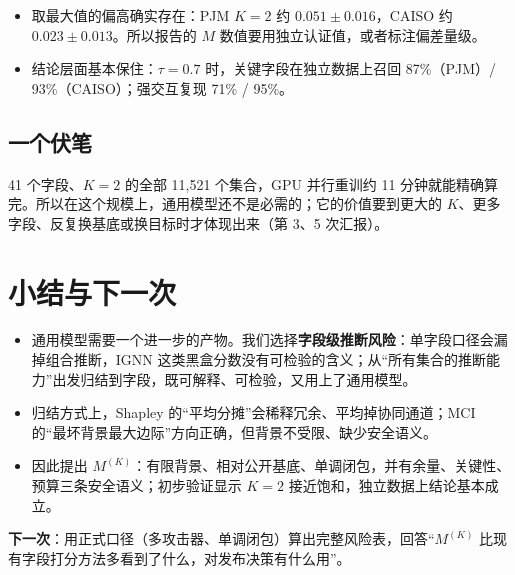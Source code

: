 \documentclass[zihao=-4,a4paper]{ctexart}
\newcommand{\M}{M^{(K)}}
\begin{document}
\begin{itemize}[leftmargin=*]
  \item 取最大值的偏高确实存在：PJM $K=2$ 约 $0.051\pm0.016$，CAISO 约 $0.023\pm0.013$。所以报告的 $M$ 数值要用独立认证值，或者标注偏差量级。
  \item 结论层面基本保住：$\tau=0.7$ 时，关键字段在独立数据上召回 87\%（PJM）/ 93\%（CAISO）；强交互复现 71\% / 95\%。
\end{itemize}

\subsection{一个伏笔}

41 个字段、$K=2$ 的全部 11,521 个集合，GPU 并行重训约 11 分钟就能精确算完。所以在这个规模上，通用模型还不是必需的；它的价值要到更大的 $K$、更多字段、反复换基底或换目标时才体现出来（第 3、5 次汇报）。

\section{小结与下一次}

\begin{keybox}[小结]
\begin{itemize}[leftmargin=*]
  \item 通用模型需要一个进一步的产物。我们选择\textbf{字段级推断风险}：单字段口径会漏掉组合推断，IGNN 这类黑盒分数没有可检验的含义；从“所有集合的推断能力”出发归结到字段，既可解释、可检验，又用上了通用模型。
  \item 归结方式上，Shapley 的“平均分摊”会稀释冗余、平均掉协同通道；MCI 的“最坏背景最大边际”方向正确，但背景不受限、缺少安全语义。
  \item 因此提出 $\M$：有限背景、相对公开基底、单调闭包，并有余量、关键性、预算三条安全语义；初步验证显示 $K=2$ 接近饱和，独立数据上结论基本成立。
\end{itemize}
\end{keybox}

\textbf{下一次}：用正式口径（多攻击器、单调闭包）算出完整风险表，回答“$\M$ 比现有字段打分方法多看到了什么，对发布决策有什么用”。
\end{document}
